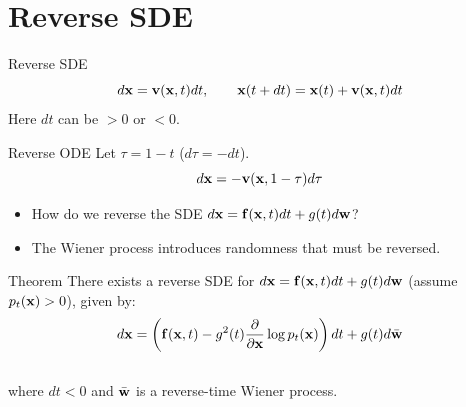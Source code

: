 \documentclass{beamer}
\renewcommand{\eqpause}{}
\begin{document}
\section{Reverse SDE}
\begin{frame}{Reverse SDE}
	\vspace{-0.3cm}
	\[
		d\mathbf{x} = \mathbf{v}(\mathbf{x}, t) dt,\qquad \mathbf{x}(t + dt) = \mathbf{x}(t) + \mathbf{v}(\mathbf{x}, t) dt
	\]
	Here $dt$ can be $>0$ or $<0$.
	\eqpause
	\begin{block}{Reverse ODE}
		Let $\tau = 1 - t$ ($d\tau = -dt$).
		\vspace{-0.3cm}
		\[
			d\mathbf{x} = - \mathbf{v}(\mathbf{x}, 1 - \tau) d\tau
		\]
	\end{block}
	\eqpause
	\vspace{-0.5cm}
	\begin{itemize}
		\item How do we reverse the SDE $d\mathbf{x} = \mathbf{f}(\mathbf{x}, t) dt + g(t) d \mathbf{w}$? 
		\item The Wiener process introduces randomness that must be reversed.
	\end{itemize}
	\eqpause
	\vspace{-0.3cm}
	\begin{block}{Theorem}
		There exists a reverse SDE for $d\mathbf{x} = \mathbf{f}(\mathbf{x}, t) dt + g(t) d \mathbf{w}$ (assume $p_t(\mathbf{x}) > 0$), given by:
		\vspace{-0.3cm}
		\[
			d\mathbf{x} = \left(\mathbf{f}(\mathbf{x}, t) - g^2(t) \frac{\partial}{\partial \mathbf{x}}\log p_t(\mathbf{x})\right) dt + g(t) d \bar{\mathbf{w}}
		\]
		\vspace{-0.5cm}\\
		where $dt<0$ and $\bar{\mathbf{w}}$ is a reverse-time Wiener process.
	\end{block}
\end{frame}
\end{document}
